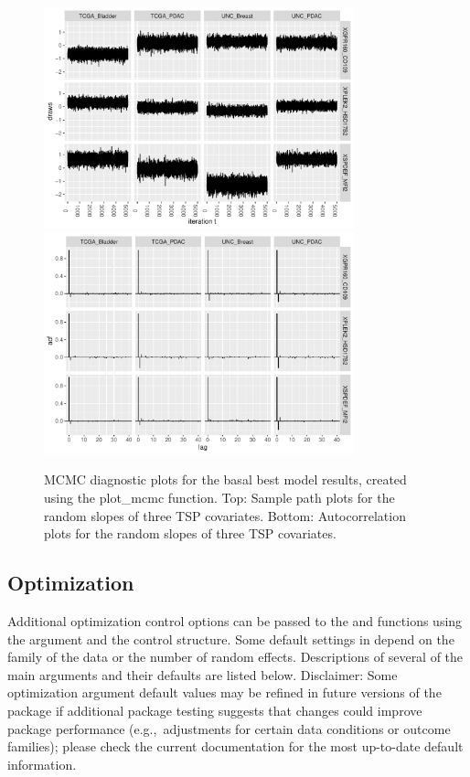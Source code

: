 \begin{figure}[h!]
    \centering
    \includegraphics[width=0.8\textwidth]{figures/Figure1A_Sample_Path.pdf}
    \includegraphics[width=0.8\textwidth]{figures/Figure1B_Autocorrelation.pdf}
    \caption{MCMC diagnostic plots for the basal best model results, created using the plot\_mcmc function. Top: Sample path plots for the random slopes of three TSP covariates. Bottom: Autocorrelation plots for the random slopes of three TSP covariates.}
    \label{fig:plotmcmc}
\end{figure}


\subsection{Optimization}
\label{sec:optimization}

Additional optimization control options can be passed to the  and
 functions using the  argument
and the  control structure. Some default settings
in  depend on the family of the data or the number of
random effects. Descriptions of several of the main
 arguments and their defaults are listed
below. Disclaimer: Some optimization argument default values may be refined in future versions of the package if additional package testing suggests that changes could improve package performance (e.g.,~adjustments for certain data conditions or outcome families); please check the current  documentation for the most up-to-date default information.

